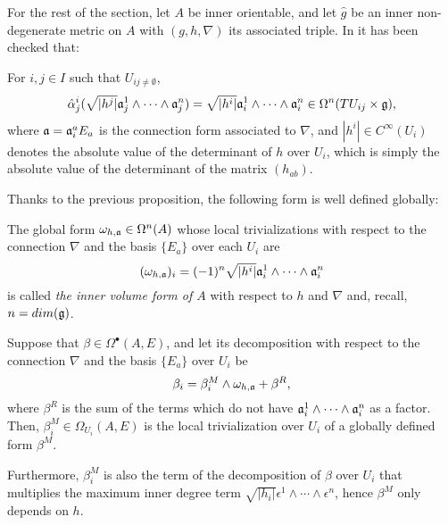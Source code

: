 For the rest of the section, let $A$ be inner orientable, and let $\hat g$ be an inner non-degenerate metric on $A$ with $(g, h, \nabla)$ its associated triple. In \cite{Fournel2011} it has been checked that:

\begin{proposition}\label{propositionInnerVolumeFormIntegrationFOrmGloballyDefinedWell}
For $i, j \in I$ such that $U_{ij \neq \emptyset}$,
\begin{equation*}
    \hat \alpha^i_j(\sqrt{|h^j|} \mathfrak{a}_j^1 \wedge \cdots \wedge \mathfrak{a}_j^n) = \sqrt{|h^i|} \mathfrak{a}_i^1 \wedge \cdots \wedge \mathfrak{a}_i^n \in \Omega^n(TU_{ij} \times \mathfrak{g}),
\end{equation*}
where $\mathfrak{a} = \mathfrak{a}_i^a E_a$ is the connection form associated to $\nabla$, and $|h^i| \in C^\infty(U_i)$ denotes the absolute value of the determinant of $h$ over $U_i$, which is simply the absolute value of the determinant of the matrix $(h_{ab})$.
\end{proposition}

\todo{}

Thanks to the previous proposition, the following form is well defined globally:
\begin{definition}
The global form $\omega_{h, \mathfrak{a}} \in \Omega^n(A)$ whose local trivializations with respect to the connection $\nabla$ and the basis $\{E_a\}$ over each $U_i$ are
\begin{equation*}
    (\omega_{h, \mathfrak{a}})_i = (-1)^n \sqrt{|h^i|} \mathfrak{a}_i^1 \wedge \cdots \wedge \mathfrak{a}_i^n
\end{equation*}
is called \emph{the inner volume form of $A$} with respect to $h$ and $\nabla$ and, recall, $n = dim(\mathfrak{g})$.
\end{definition}

\begin{theorem}\label{theoremIntegratedFormFactorInnerVolumeFOrmWellGloballyDefined}
Suppose that $\beta \in \Omega^\bullet(A, E)$, and let its decomposition with respect to the connection $\nabla$ and the basis $\{E_a\}$ over $U_i$ be
\begin{equation*}
    \beta_i = \beta^{M}_i \wedge \omega_{h, \alg a}%
    + \beta^R,
\end{equation*}
where $\beta^R$ is the sum of the terms which do not have $\mathfrak{a}_i^1 \wedge \cdots \wedge \mathfrak{a}_i^n$ as a factor. Then, $\beta_i^M \in \Omega_{U_i}(A, E)$ is the local trivialization over $U_i$ of a globally defined form $\beta^M$.

Furthermore, $\beta_i^M$ is also the term of the decomposition of $\beta$ over $U_i$ that multiplies the maximum inner degree term $\sqrt{|h_i|} \epsilon^1 \wedge \cdots \wedge \epsilon^n$, hence $\beta^M$ only depends on $h$.
\end{theorem}

